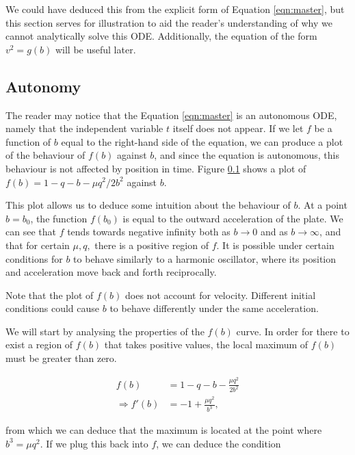 \documentclass{article}
\begin{document}
We could have deduced this from the explicit form of Equation \ref{eqn:master},
but this section serves for illustration to aid the reader's understanding of why we cannot analytically solve this ODE.
Additionally, the equation of the form $v^2 = g(b)$ will be useful later.


\subsection{Autonomy}


The reader may notice that the Equation \ref{eqn:master} is an autonomous ODE,
namely that the independent variable $t$ itself does not appear.
If we let $f$ be a function of $b$ equal to the right-hand side of the equation,
we can produce a plot of the behaviour of $f(b)$ against $b$,
and since the equation is autonomous, this behaviour is not affected by position in time.
Figure \ref{} shows a plot of $f(b)= 1 - q - b - \mu q^2/2b^2$ against $b$.

This plot allows us to deduce some intuition about the behaviour of $b$.
At a point $b=b_0$, the function $f(b_0)$ is equal to the outward acceleration of the plate.
We can see that $f$ tends towards negative infinity both as $b\rightarrow 0$ and as $b\rightarrow\infty$,
and that for certain $\mu, q,$ there is a positive region of $f$. 
It is possible under certain conditions for $b$ to behave similarly to a harmonic oscillator,
where its position and acceleration move back and forth reciprocally.

Note that the plot of $f(b)$ does not account for velocity.
Different initial conditions could cause $b$ to behave differently under the same acceleration.

We will start by analysing the properties of the $f(b)$ curve.
In order for there to exist a region of $f(b)$ that takes positive values,
the local maximum of $f(b)$ must be greater than zero.

\begin{align}
    f(b) &= 1 - q - b - \frac{\mu q^2}{2b^2} \\
    \Rightarrow f'(b) &= -1 + \frac{\mu q^2}{b^3},
\end{align}

from which we can deduce that the maximum is located at the point where $b^3 = \mu q^2$.
If we plug this back into $f$, we can deduce the condition
\end{document}
